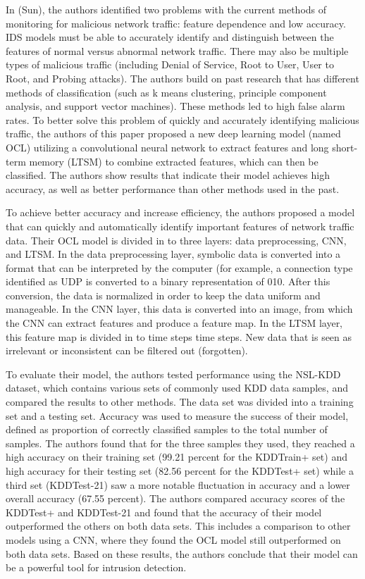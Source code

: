 In (Sun), the authors identified two problems with the current methods of monitoring for malicious network traffic: feature dependence and low accuracy. IDS models must be able to accurately identify and distinguish between the features of normal versus abnormal network traffic. There may also be multiple types of malicious traffic (including Denial of Service, Root to User, User to Root, and Probing attacks). The authors build on past research that has different methods of classification (such as k means clustering, principle component analysis, and support vector machines). These methods led to high false alarm rates. To better solve this problem of quickly and accurately identifying malicious traffic, the authors of this paper proposed a new deep learning model (named OCL) utilizing a convolutional neural network to extract features and long short-term memory (LTSM) to combine extracted features, which can then be classified. The authors show results that indicate their model achieves high accuracy, as well as better performance than other methods used in the past. 

To achieve better accuracy and increase efficiency, the authors proposed a model that can quickly and automatically identify important features of network traffic data. Their OCL model is divided in to three layers: data preprocessing, CNN, and LTSM. In the data preprocessing layer, symbolic data is converted into a format that can be interpreted by the computer (for example, a connection type identified as UDP is converted to a binary representation of 010. After this conversion, the data is normalized in order to keep the data uniform and manageable. In the CNN layer, this data is converted into an image, from which the CNN can extract features and produce a feature map. In the LTSM layer, this feature map is divided in to time steps time steps. New data that is seen as irrelevant or inconsistent can be filtered out (forgotten). 

To evaluate their model, the authors tested performance using the NSL-KDD dataset, which contains various sets of commonly used KDD data samples, and compared the results to other methods. The data set was divided into a training set and a testing set. Accuracy was used to measure the success of their model, defined as proportion of correctly classified samples to the total number of samples. The authors found that for the three samples they used, they reached a high accuracy on their training set (99.21 percent for the KDDTrain+  set) and high accuracy for their testing set (82.56 percent for the KDDTest+ set) while a third set (KDDTest-21) saw a more notable fluctuation in accuracy and a lower overall accuracy (67.55 percent). The authors compared accuracy scores of the KDDTest+ and KDDTest-21 and found that the accuracy of their model outperformed the others on both data sets. This includes a comparison to other models using a CNN, where they found the OCL model still outperformed on both data sets. Based on these results, the authors conclude that their model can be a powerful tool for intrusion detection. 

